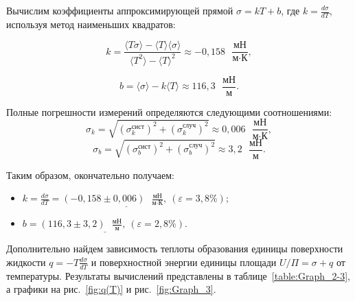 \documentclass[a4paper, 12pt]{article}
\begin{document}
    \noindent Вычислим коэффициенты аппроксимирующей прямой $\sigma = kT + b$, где $ \displaystyle k = \frac{d\sigma}{dT} $, используя метод наименьших квадратов:

    \[ k = \frac{\langle T\sigma \rangle - \langle T \rangle \langle \sigma \rangle}{\langle T^2 \rangle - \langle T \rangle ^2} \approx -0,158\text{ } \frac{\text{мН}}{\text{м}\cdot\text{К}},\]
    
    \[ b = \langle \sigma \rangle - k\langle T \rangle \approx 116,3\text{ } \frac{\text{мН}}{\text{м}}. \]

    \noindent Полные погрешности измерений определяются следующими соотношениями:
    \[ \sigma_k = \sqrt{(\sigma_k^\text{сист})^2 + (\sigma_k^\text{случ})^2} \approx 0,006 \text{ } \frac{\text{мН}}{\text{м}\cdot\text{К}},\]
    \[ \sigma_b = \sqrt{(\sigma_b^\text{сист})^2 + (\sigma_b^\text{случ})^2} \approx 3,2 \text{ } \frac{\text{мН}}{\text{м}}. \]

    \noindent Таким образом, окончательно получаем:
    \begin{itemize}
            \item $\displaystyle \underline{k = \frac{d\sigma}{dT} = (-0,158 \pm 0,006) \text{ } \frac{\text{мН}}{\text{м}\cdot\text{К}}, \: (\varepsilon = 3,8\%);}$
            \item $\displaystyle \underline{b = (116,3 \pm 3,2) \text{ } \frac{\text{мН}}{\text{м}}, \: (\varepsilon = 2,8\%).}$
    \end{itemize}

    \noindent Дополнительно найдем зависимость теплоты образования единицы поверхности жидкости $q =-T\frac{d\sigma}{dT}$ и поверхностной энергии единицы площади $U/\Pi =\sigma + q$ от температуры. Результаты вычислений представлены в таблице~\ref{table:Graph_2-3}, а графики на рис.~\ref{fig:q(T)} и рис.~\ref{fig:Graph_3}.
\end{document}
